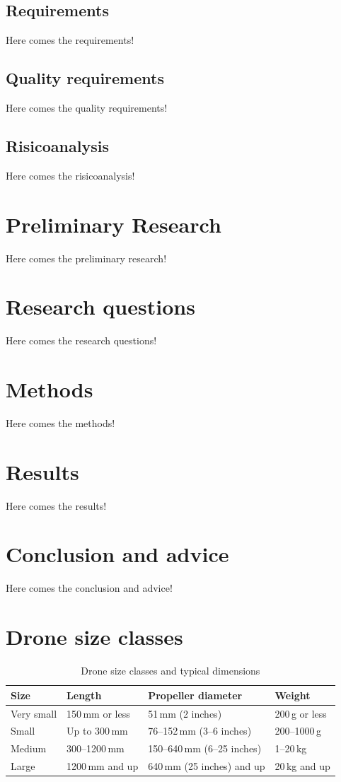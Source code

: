 \documentclass[conference]{IEEEtran}
\begin{document}
\subsection{Requirements}
Here comes the requirements!

\subsection{Quality requirements}
Here comes the quality requirements!

\subsection{Risicoanalysis}
Here comes the risicoanalysis!

\section{Preliminary Research}
Here comes the preliminary research!

\section{Research questions}
Here comes the research questions!

\section{Methods}
Here comes the methods!

\section{Results}
Here comes the results!

\section{Conclusion and advice}
Here comes the conclusion and advice!

\section{Drone size classes}
\begin{table}[b]
\caption{Drone size classes and typical dimensions}
\label{tab:drone-sizes}
\begin{center}
\begin{tabular}{llll}
\hline
\textbf{Size} & \textbf{Length} & \textbf{Propeller diameter} & \textbf{Weight}\\
\hline
Very small & 150\,mm or less & 51\,mm (2 inches) & 200\,g or less \\
Small & Up to 300\,mm & 76--152\,mm (3--6 inches) & 200--1000\,g \\
Medium & 300--1200\,mm & 150--640\,mm (6--25 inches) & 1--20\,kg \\
Large & 1200\,mm and up & 640\,mm (25 inches) and up & 20\,kg and up \\
\hline
\end{tabular}
\end{center}
\end{table}
\end{document}
